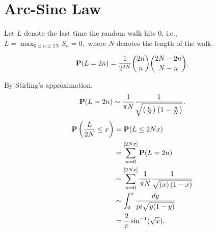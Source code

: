 \documentclass[main]{subfiles}
\begin{document}
\section{Arc-Sine Law}
Let $L$ denote the last time the random walk hits 0, i.e., $L=\max_{0\leq n \leq 2N} {S_n=0},$ where $N$ denotes the length of the walk.
\begin{theorem}
    $$\P(L=2n)=\frac{1}{2^{2N}}\binom{2n}{n}\binom{2N-2n}{N-n}.$$
    \label{thm:arcsin}
\end{theorem}
\begin{remark}
    By Stirling's approximation,
    $$\P(L=2n)\sim \frac{1}{\pi N}\frac{1}{\sqrt{\left(\frac{n}{N}\right)\left(1-\frac{n}{N}\right)}}.$$
    $$
        \begin{aligned}
            \P\left(\frac{L}{2N}\leq x\right) & =\P(L\leq 2Nx)                                                                         \\
                                              & =\sum_{n=0}^{[2Nx]}\P(L=2n)                                                            \\
                                              & \sim \sum_{n=0}^{[2Nx]} \frac{1}{\pi N}\frac{1}{\sqrt{\left(x\right)\left(1-x\right)}} \\
                                              & \sim \int_{0}^{x}\frac{dy}{pi\sqrt{y(1-y)}}                                            \\
                                              & =\frac{2}{\pi}\sin^{-1}(\sqrt{x}).
        \end{aligned}
    $$
\end{remark}
\end{document}
